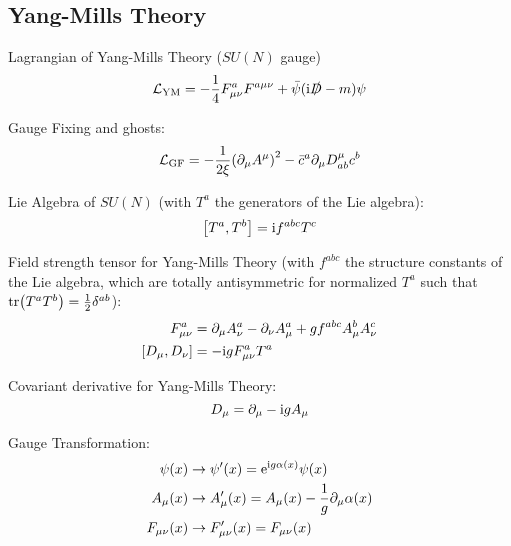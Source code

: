 	\subsection{Yang-Mills Theory}
		Lagrangian of Yang-Mills Theory ($SU(N)$ gauge)
		\begin{equation}
			\mathcal{L}_\text{YM} = -\frac{1}{4} F^a_{\mu\nu} F^{a\mu\nu} + \bar{\psi}(\mathrm{i}\slashed{D}-m)\psi
		\end{equation}

		\noindent
		Gauge Fixing and ghosts:
		\begin{equation}
			\mathcal{L}_\text{GF} = -\frac{1}{2\xi} \qty(\partial_\mu A^\mu)^2 - \bar{c}^a \partial_\mu D^\mu_{ab} c^b
		\end{equation}

		\noindent
		Lie Algebra of $SU(N)$ (with $T^a$ the generators of the Lie algebra):
		\begin{equation}
			\comm{T^a}{T^b} = \i f^{abc} T^c
		\end{equation}

		\noindent
		Field strength tensor for Yang-Mills Theory (with $f^{abc}$ the structure constants of the Lie algebra, which are totally antisymmetric for normalized $T^a$ such that $\tr(T^a T^b) = \frac{1}{2} \delta^{ab}$):
		\begin{equation}
			\begin{aligned}
				F^a_{\mu\nu} &= \partial_\mu A^a_\nu - \partial_\nu A^a_\mu + g f^{abc} A^b_\mu A^c_\nu \\
				\comm{D_\mu}{D_\nu} &= -\i g F_{\mu\nu}^a T^a				
			\end{aligned}
		\end{equation}

		\noindent
		Covariant derivative for Yang-Mills Theory:
		\begin{equation}
			D_\mu = \partial_\mu - \mathrm{i} g A_\mu
		\end{equation}

		\noindent
		Gauge Transformation:
		\begin{equation}
			\begin{aligned}
				\psi(x) &\rightarrow \psi'(x) = \mathrm{e}^{\mathrm{i} g \alpha(x)} \psi(x) \\
				A_\mu(x) &\rightarrow A'_\mu(x) = A_\mu(x) - \frac{1}{g} \partial_\mu \alpha(x) \\
				F_{\mu\nu}(x) &\rightarrow F'_{\mu\nu}(x) = F_{\mu\nu}(x) 
			\end{aligned}
		\end{equation}

